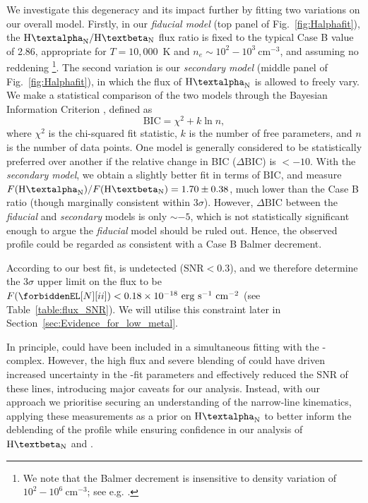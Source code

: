 \documentclass[fleqn,usenatbib]{mnras}
\newcommand{\Halpha}{\text{H\textalpha}\xspace}
\newcommand{\Hbeta}{\text{H\textbeta}\xspace}
\newcommand{\NII}{\forbiddenEL[N][ii]}
\newcommand{\NIIall}{\forbiddenEL[N][ii][\textlambda][\textlambda][6548,][6583]}
\begin{document}
We investigate this degeneracy and its impact further by fitting two variations on our overall \Halpha model.
Firstly, in our \textit{fiducial \Halpha model} (top panel of Fig.~\ref{fig:Halphafit}), the $\Halpha_\mathrm{N}/\Hbeta_\mathrm{N}$ flux ratio is fixed to the typical Case B value of 2.86, appropriate for $T=10,000$~K and $n_e\sim10^2 - 10^3 \ \mathrm{cm}^{-3}$, and assuming no reddening \citep[][here accounting for relative ALCs between \Halpha and \Hbeta]{Osterbrock2006}\footnote{We note that the Balmer decrement is insensitive to density variation of $10^2-10^6 \ \mathrm{cm}^{-3}$; see e.g. \cite{StoreyHummer1995}.}.
The second variation is our \textit{secondary \Halpha model} (middle panel of Fig.~\ref{fig:Halphafit}), in which the flux of $\Halpha_\mathrm{N}$ is allowed to freely vary. 
We make a statistical comparison of the two models through the Bayesian Information Criterion \citep[BIC; see e.g.][]{Schwarz1978}, defined as
\begin{equation}
    \text{BIC} = \chi^2 + k \ln n,
    \label{eq:BIC}
\end{equation}
where $\chi^2$ is the chi-squared fit statistic, $k$ is the number of free parameters, and $n$ is the number of data points. 
One model is generally considered to be statistically preferred over another if the relative change in BIC ($\Delta\mathrm{BIC}$) is $<-10$.
With the \textit{secondary \Halpha model}, we obtain a slightly better fit in terms of $\mathrm{BIC}$, and measure $F(\Halpha_\mathrm{N})/F(\Hbeta_\mathrm{N}) = 1.70\pm0.38$, much lower than the Case B ratio (though marginally consistent within $3\sigma$). 
However, $\Delta\mathrm{BIC}$ between the \textit{fiducial} and \textit{secondary} \Halpha models is only $\sim -5$, which is not statistically significant enough to argue the \textit{fiducial} model should be ruled out. 
Hence, the observed \Halpha profile could be regarded as consistent with a Case B Balmer decrement.

According to our best fit, \NIIall is undetected ($\mathrm{SNR}<0.3$), and we therefore determine the $3\sigma$ upper limit on the \NIIall flux to be $F(\NII) < 0.18 \times 10^{-18} \ \mathrm{erg} \ \mathrm{s}^{-1} \ \mathrm{cm}^{-2}$ (see Table~\ref{table:flux_SNR}).
We will utilise this constraint later in Section~\ref{sec:Evidence_for_low_metal}.

In principle, \Halpha could have been included in a simultaneous fitting with the \Hbeta-\OIIIL complex. 
However, the high flux and severe blending of \Halpha could have driven increased uncertainty in the \Hbeta-\OIIIL fit parameters and effectively reduced the SNR of these lines, introducing major caveats for our analysis. 
Instead, with our approach we prioritise securing an understanding of the narrow-line kinematics, applying these measurements as a prior on $\Halpha_\mathrm{N}$ to better inform the deblending of the \Halpha profile while ensuring confidence in our analysis of $\Hbeta_\mathrm{N}$ and \OIIIL[5007].
\end{document}
